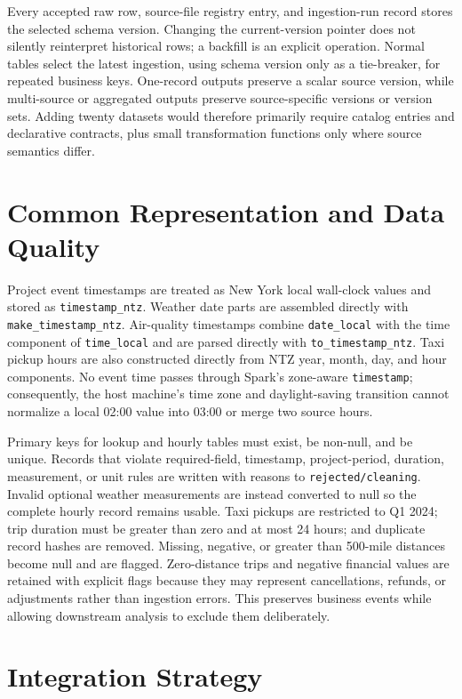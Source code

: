 \documentclass[10pt,a4paper]{article}
\begin{document}
Every accepted raw row, source-file registry entry, and ingestion-run record
stores the selected schema version. Changing the current-version pointer does
not silently reinterpret historical rows; a backfill is an explicit operation.
Normal tables select the latest ingestion, using schema version only as a
tie-breaker, for repeated business keys. One-record outputs preserve a scalar source
version, while multi-source or aggregated outputs preserve source-specific
versions or version sets. Adding twenty datasets would therefore primarily
require catalog entries and declarative contracts, plus small transformation
functions only where source semantics differ.

\section{Common Representation and Data Quality}

Project event timestamps are treated as New York local wall-clock values and
stored as \texttt{timestamp\_ntz}. Weather date parts are assembled directly
with \texttt{make\_timestamp\_ntz}. Air-quality timestamps combine
\texttt{date\_local} with the time component of \texttt{time\_local} and are
parsed directly with \texttt{to\_timestamp\_ntz}. Taxi pickup hours are also
constructed directly from NTZ year, month, day, and hour components. No event
time passes through Spark's zone-aware \texttt{timestamp}; consequently, the
host machine's time zone and daylight-saving transition cannot normalize a
local 02:00 value into 03:00 or merge two source hours.

Primary keys for lookup and hourly tables must exist, be non-null, and be
unique. Records that violate required-field, timestamp, project-period,
duration, measurement, or unit rules are written with reasons to
\texttt{rejected/cleaning}. Invalid optional weather measurements are instead
converted to null so the complete hourly record remains usable. Taxi pickups
are restricted to Q1 2024; trip duration must be greater than zero and at most
24 hours; and duplicate record hashes are removed. Missing, negative, or
greater than 500-mile distances become null and are flagged. Zero-distance
trips and negative financial values are retained with explicit flags because
they may represent cancellations, refunds, or adjustments rather than
ingestion errors. This preserves business events while allowing downstream
analysis to exclude them deliberately.

\section{Integration Strategy}
\end{document}
